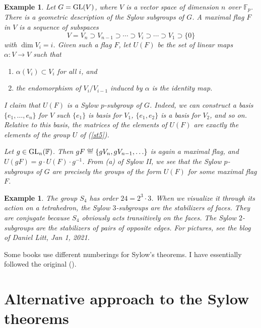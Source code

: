 \documentclass[a4paper,11pt,final]{memoir}%
\newtheorem{example}[X]{Example}
\theoremstyle{nonumberplain}
\begin{document}
\begin{example}
\label{st11}Let $G=\operatorname{GL}(V)$, where $V$ is a vector space of dimension $n$ over
$\mathbb{F}{}_{p}$. There is a geometric description of the Sylow subgroups of
$G$. A \emph{maximal flag}%
$F$ in $V$ is a sequence of subspaces
\[
V=V_{n}\supset V_{n-1}\supset\cdots\supset V_{i}\supset\cdots\supset
V_{1}\supset\{0\}
\]
with $\dim V_{i}=i$. Given such a flag $F$, let $U(F)$ be the set of linear
maps $\alpha\colon V\rightarrow V$ such that

\begin{enumerate}
\item $\alpha(V_{i})\subset V_{i}$ for all $i$, and

\item the endomorphism of $V_{i}/V_{i-1}$ induced by $\alpha$ is the identity map.
\end{enumerate}

\noindent I claim that $U(F)$ is a Sylow $p$-subgroup of $G$. Indeed, we can
construct a basis $\{e_{1},\ldots,e_{n}\}$ for $V$ such $\{e_{1}\}$ is basis
for $V_{1}$, $\{e_{1},e_{2}\}$ is a basis for $V_{2}$, and so on. Relative to
this basis, the matrices of the elements of $U(F)$ are exactly the elements of
the group $U$ of (\ref{st5}).

Let $g\in\operatorname{GL}_{n}(\mathbb{F})$. Then $gF\overset{\df}{=}%
\{gV_{n},gV_{n-1},\ldots\}$ is again a maximal flag, and $U(gF)=g\cdot
U(F)\cdot g^{-1}$. From (a) of Sylow II, we see that the Sylow $p$-subgroups
of $G$ are precisely the groups of the form $U(F)$ for some maximal flag $F$.
\end{example}

\begin{example}
\label{st10a}The group $S_{4}$ has order $24=2^{3}\cdot3$. When we visualize
it through its action on a tetrahedron, the Sylow $3$-subgroups are the
stabilizers of faces. They are conjugate because $S_{4}$ obviously acts
transitively on the faces. The Sylow $2$-subgroups are the stabilizers of
pairs of opposite edges. For pictures, see the blog of Daniel Litt, Jan 1, 2021.
\end{example}

Some books use different numberings for Sylow's theorems. I have essentially
followed the original (\cite{sylow1872}).

\section{Alternative approach to the Sylow theorems}
\end{document}
